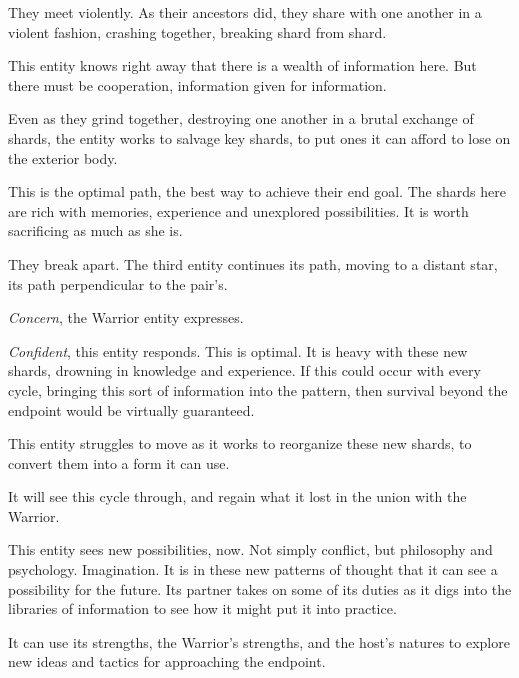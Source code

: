 They meet violently.  As their ancestors did, they share with one another in a violent fashion, crashing together, breaking shard from shard.



This entity knows right away that there is a wealth of information here.  But there must be cooperation, information given for information.



Even as they grind together, destroying one another in a brutal exchange of shards, the entity works to salvage key shards, to put ones it can afford to lose on the exterior body.



This is the optimal path, the best way to achieve their end goal.  The shards here are rich with memories, experience and unexplored possibilities.  It is worth sacrificing as much as she is.



They break apart.  The third entity continues its path, moving to a distant star, its path perpendicular to the pair's.



\emph{Concern}, the Warrior entity expresses.



\emph{Confident}, this entity responds.  This is optimal.  It is heavy with these new shards, drowning in knowledge and experience.  If this could occur with every cycle, bringing this sort of information into the pattern, then survival beyond the endpoint would be virtually guaranteed.



This entity struggles to move as it works to reorganize these new shards, to convert them into a form it can use.



It will see this cycle through, and regain what it lost in the union with the Warrior.



This entity sees new possibilities, now.  Not simply conflict, but philosophy and psychology.  Imagination.  It is in these new patterns of thought that it can see a possibility for the future.  Its partner takes on some of its duties as it digs into the libraries of information to see how it might put it into practice.



It can use its strengths, the Warrior's strengths, and the host's natures to explore new ideas and tactics for approaching the endpoint.



